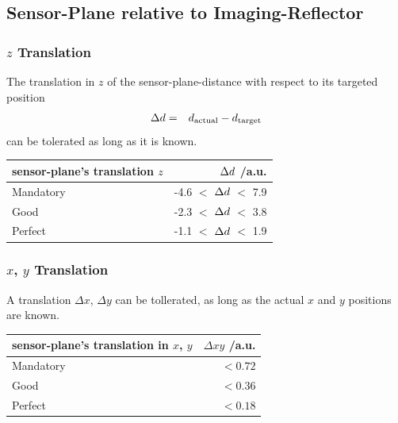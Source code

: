 \documentclass[11pt,a4paper,oneside,titlepage]{article}
\begin{document}
\subsection{Sensor-Plane relative to Imaging-Reflector}
\subsubsection{$z$ Translation}
%
The translation in $z$ of the sensor-plane-distance with respect to its targeted position
%
\begin{eqnarray}
\Delta d & = & d_\text{actual} -d_\text{target}
\end{eqnarray}
%
can be tolerated as long as it is known.
%
%
\begin{table}[H]
    \begin{center}
        \begin{tabular}{lr}
            sensor-plane's translation $z$ & $\Delta d$ /a.u.\\
            \toprule
            Mandatory & -4.6 $<$ $\Delta d$ $<$ 7.9\\
            Good      & -2.3 $<$ $\Delta d$ $<$ 3.8\\
            Perfect   & -1.1 $<$ $\Delta d$ $<$ 1.9\\
            \bottomrule
        \end{tabular}
    \end{center}
\end{table}
\subsubsection{$x$, $y$ Translation}
%
A translation $\Delta x$, $\Delta y$ can be tollerated, as long as the actual $x$ and $y$ positions are known.
%
%
\begin{table}[H]
    \begin{center}
        \begin{tabular}{lr}
            sensor-plane's translation in $x$, $y$ & $\Delta xy$ /a.u.\\
            \toprule
            Mandatory & $< 0.72$\\
            Good      & $< 0.36$\\
            Perfect   & $< 0.18$\\
            \bottomrule
        \end{tabular}
    \end{center}
\end{table}
\end{document}
